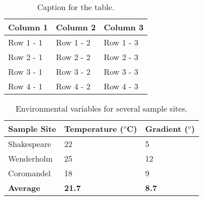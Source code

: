 \documentclass[12pt]{article}
\begin{document}
\begin{table}[H]
\begin{tabular}{l l l}
\toprule
\textbf{Column 1} & \textbf{Column 2} & \textbf{Column 3}\\
\toprule
Row 1 - 1 & Row 1 - 2 & Row 1 - 3 \\
Row 2 - 1 & Row 2 - 2 & Row 2 - 3 \\
Row 3 - 1 & Row 3 - 2 & Row 3 - 3 \\
\midrule
Row 4 - 1 & Row 4 - 2 & Row 4 - 3 \\
\bottomrule
\end{tabular}
\caption{Caption for the table.}
\label{tab:table1}
\end{table}

\begin{table}[H]
\begin{tabular}{l l l}
\toprule
\textbf{Sample Site} & \textbf{Temperature ($^o$C)} & \textbf{Gradient ($^o$)}\\
\toprule
Shakespeare & 22 & 5\\
Wenderholm & 25 & 12\\
Coromandel & 18 & 9\\
\midrule
\textbf{Average} & \textbf{21.7} & \textbf{8.7}\\
\bottomrule
\end{tabular}
\caption{Environmental variables for several sample sites.}
\label{tab:env_var_sites}
\end{table}
\end{document}
